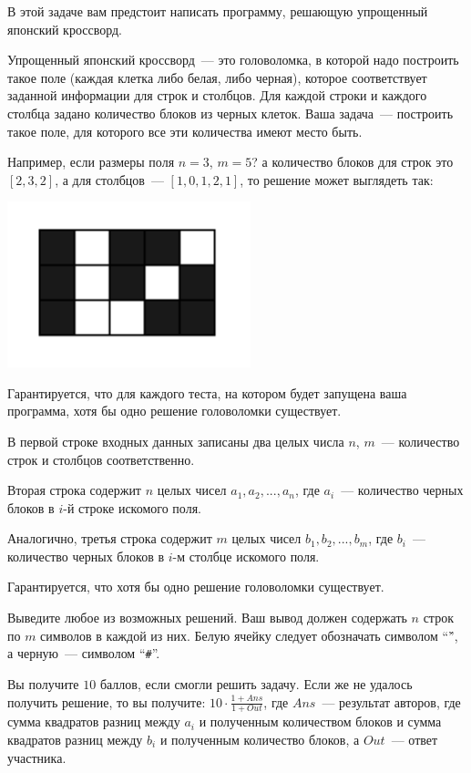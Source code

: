
В этой задаче вам предстоит написать программу, решающую упрощенный японский кроссворд.

Упрощенный японский кроссворд~--- это головоломка, в которой надо построить такое поле
(каждая клетка либо белая, либо черная), которое соответствует заданной информации для строк и столбцов.
Для каждой строки и каждого столбца задано количество блоков из черных клеток.
Ваша задача~--- построить такое поле, для которого все эти количества имеют место быть.

Например, если размеры поля $n = 3$, $m = 5$? а количество блоков для строк это $[2, 3, 2]$, а для столбцов~--- $[1, 0, 1, 2, 1]$, то решение может выглядеть так:

\begin{center}
	\includegraphics[width=200pt,natwidth=680,natheight=544]{tasks/crossword/statements/images/crossword.png}
\end{center}

Гарантируется, что для каждого теста, на котором будет запущена ваша программа, хотя бы одно решение головоломки существует.

\Input
В первой строке входных данных записаны два целых числа $n$, $m$~--- количество строк и столбцов соответственно.

Вторая строка содержит $n$ целых чисел $a_1, a_2, ..., a_n$, где $a_i$~--- количество черных блоков в $i$-й строке искомого поля.

Аналогично, третья строка содержит $m$ целых чисел $b_1, b_2, ..., b_m$, где $b_i$~--- количество черных блоков в $i$-м столбце искомого поля.

Гарантируется, что хотя бы одно решение головоломки существует.

\Output
Выведите любое из возможных решений. Ваш вывод должен содержать $n$ строк по $m$ символов в каждой из них.
Белую ячейку следует обозначать символом ``\texttt{\.}'', а черную~--- символом ``\texttt{\#}''.

\Samples
\BeginTests
\EndTests

\Scoring
Вы получите $10$ баллов, если смогли решить задачу. Если же не удалось получить решение, то вы получите: $10 \cdot \frac{1 + Ans}{1 + Out}$, где $Ans$~---
результат авторов, где сумма квадратов разниц между $a_i$ и полученным количеством блоков и сумма квадратов разниц между $b_i$ и полученным количество блоков,
а $Out$~--- ответ участника.

\EndProblem
